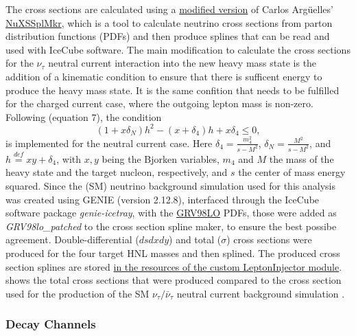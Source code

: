 The cross sections are calculated using a \href{https://github.com/LeanderFischer/NuXSSplMkr/tree/massive_nu_nc_dis}{modified version} of Carlos Argüelles' \href{https://github.com/arguelles/NuXSSplMkr}{NuXSSplMkr}, which is a tool to calculate neutrino cross sections from parton distribution functions (PDFs) and then produce splines that can be read and used with IceCube software. The main modification to calculate the cross sections for the $\nu_\tau$ neutral current interaction into the new heavy mass state is the addition of a kinematic condition to ensure that there is sufficent energy to produce the heavy mass state. It is the same confition that needs to be fulfilled for the charged current case, where the outgoing lepton mass is non-zero. Following  (equation 7), the condition
\begin{equation}
    (1 + x \delta_N) h^2 - (x + \delta_{4}) h + x \delta_{4} \leq 0,
\end{equation}
is implemented for the neutral current case. Here $\delta_{4}=\frac{m_4^2}{s-M^2}$, $\delta_{N}=\frac{M^2}{s-M^2}$, and $h \overset{\textit{def}}{=} xy + \delta_{4}$, with $x, y$ being the Bjorken variables, $m_4$ and $M$ the mass of the heavy state and the target nucleon, respectively, and $s$ the center of mass energy squared. Since the (SM) neutrino background simulation used for this analysis was created using GENIE (version 2.12.8), interfaced through the IceCube software package \textit{genie-icetray}, with the \href{https://internal.dunescience.org/doxygen/classgenie_1_1GRV89LO.html}{GRV98LO} PDFs, those were added as \textit{GRV98lo\_patched} to the cross section spline maker, to ensure the best possibe agreement. Double-differential ($dsdxdy$) and total ($\sigma$) cross sections were produced for the four target HNL masses and then splined. The produced cross section splines are stored \href{https://github.com/LeanderFischer/LeptonInjector-HNL/tree/main/LeptonInjector/resources/cross_sections}{in the resources of the custom LeptonInjector module}.  shows the total cross sections that were produced compared to the cross section used for the production of the SM $\nu_\tau/\bar{\nu}_\tau$ neutral current background simulation .


\subsubsection{Decay Channels}

